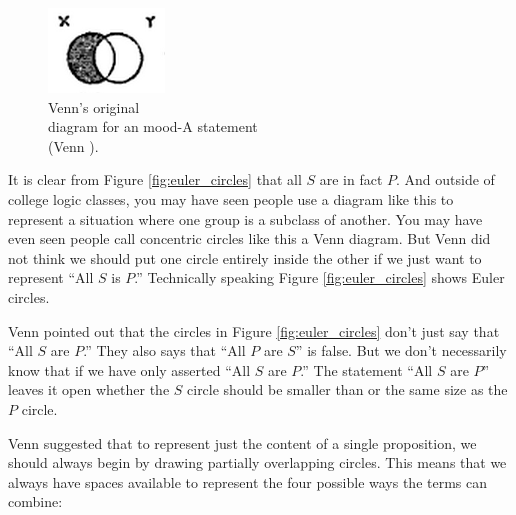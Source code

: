 \begin{figure}
\begin{mdframed}[style=mytableclearbox, userdefinedwidth=.3\textwidth]
\begin{center}
\includegraphics*{img/OriginalVenn}
\end{center}
\end{mdframed}
\caption{Venn's original \\ diagram for an mood-A statement \\(Venn \citeyear{Venn1880a}).}
\end{figure}


It is clear from Figure \ref{fig:euler_circles} that all $S$ are in fact $P$. And outside of college logic classes, you may have seen people use a diagram like this to represent a situation where one group is a subclass of another. You may have even seen people call concentric circles like this a Venn diagram. But Venn did not think we should put one circle entirely inside the other if we just want to represent ``All $S$ is $P$.'' Technically speaking Figure \ref{fig:euler_circles} shows Euler circles.

Venn pointed out that the circles in Figure \ref{fig:euler_circles} don't just say that ``All $S$ are $P$.'' They also says that ``All $P$ are $S$'' is false. But we don't necessarily know that if we have only asserted ``All $S$ are $P$.'' The statement ``All $S$ are $P$'' leaves it open whether the $S$ circle should be smaller than or the same size as the $P$ circle.

Venn suggested that to represent just the content of a single proposition, we should always begin by drawing partially overlapping circles. This means that we always have spaces available to represent the four possible ways the terms can combine: 

\begin{center}
\label{fig:two_circle_venn}
\end{center}


